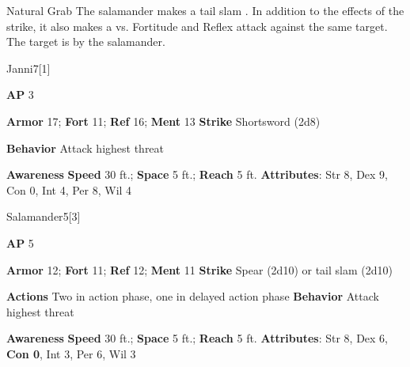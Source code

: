 \vspace{0.5em}
\begin{ability}{Natural Grab}
The salamander makes a tail slam .
In addition to the effects of the strike, it also makes a  vs. Fortitude and Reflex attack against the same target.
\hit The target is  by the salamander.
\end{ability}






\begin{monsection}{Janni}{7}[1]
\vspace{-1em}\vspace{-1em}
\begin{spellcontent}
\begin{spelltargetinginfo}
{\textbf{AP} 3}

\pari \textbf{Armor} 17;
\textbf{Fort} 11;
\textbf{Ref} 16;
\textbf{Ment} 13
\pari \textbf{Strike} Shortsword  (2d8)



\pari \textbf{Behavior} Attack highest threat
\end{spelltargetinginfo}
\end{spellcontent}

\begin{monsterfooter}
\pari \textbf{Awareness} 
\pari \textbf{Speed} 30 ft.;
\textbf{Space} 5 ft.;
\textbf{Reach} 5 ft.
\pari \textbf{Attributes}:
Str 8,
Dex 9,
Con 0,
Int 4,
Per 8,
Wil 4
\end{monsterfooter}
\end{monsection}





\begin{monsection}[Battlemaster]{Salamander}{5}[3]
\vspace{-1em}\vspace{-1em}
\begin{spellcontent}
\begin{spelltargetinginfo}
{\textbf{AP} 5}

\pari \textbf{Armor} 12;
\textbf{Fort} 11;
\textbf{Ref} 12;
\textbf{Ment} 11
\pari \textbf{Strike} Spear  (2d10) or tail slam  (2d10)


\pari \textbf{Actions} Two in action phase, one in delayed action phase
\pari \textbf{Behavior} Attack highest threat
\end{spelltargetinginfo}
\end{spellcontent}

\begin{monsterfooter}
\pari \textbf{Awareness} 
\pari \textbf{Speed} 30 ft.;
\textbf{Space} 5 ft.;
\textbf{Reach} 5 ft.
\pari \textbf{Attributes}:
Str 8,
Dex 6,
\textbf{Con 0},
Int 3,
Per 6,
Wil 3
\end{monsterfooter}
\end{monsection}


